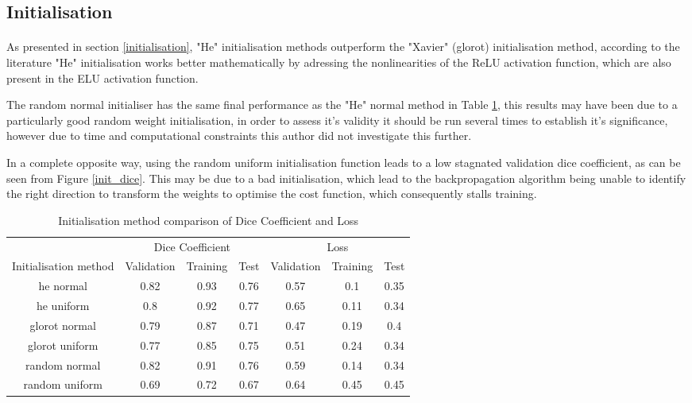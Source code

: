 \subsection{Initialisation}
\paragraph{}
As presented in section \ref{initialisation}, "He" initialisation methods outperform the "Xavier" (glorot) initialisation method, according to the literature "He" initialisation works better mathematically by adressing the nonlinearities of the \gls{ReLU} activation function, which are also present in the \gls{ELU} activation function. 

The random normal initialiser has the same final performance as the "He" normal method in Table \ref{tab_init}, this results may have been due to a particularly good random weight initialisation, in order to assess it's validity it should be run several times to establish it's significance, however due to time and computational constraints this author did not investigate this further.

In a complete opposite way, using the random uniform initialisation function leads to a low stagnated validation dice coefficient, as can be seen from Figure \ref{init_dice}. This may be due to a bad initialisation, which lead to the backpropagation algorithm being unable to identify the right direction to transform the weights to optimise the cost function, which consequently stalls training.

\begin{table}[ht!] 
    \begin{center}
    \begin{tabular}{ccccccc} 
    \toprule
       & \multicolumn{3}{c}{Dice Coefficient}     & \multicolumn{3}{c}{Loss} \\
    Initialisation method & Validation & Training & Test & Validation    & Training    & Test   \\ \midrule
    \rowcolor{lightgray} he normal & 0.82 & 0.93 & 0.76 & 0.57 & 0.1 & 0.35  \\ he uniform & 0.8 & 0.92 & 0.77 & 0.65 & 0.11 & 0.34  \\ glorot normal & 0.79 & 0.87 & 0.71 & 0.47 & 0.19 & 0.4  \\ glorot uniform & 0.77 & 0.85 & 0.75 & 0.51 & 0.24 & 0.34  \\ random normal & 0.82 & 0.91 & 0.76 & 0.59 & 0.14 & 0.34  \\ random uniform & 0.69 & 0.72 & 0.67 & 0.64 & 0.45 & 0.45  \\
    \bottomrule
    \end{tabular}
  \end{center} 
  \caption{Initialisation method comparison of Dice Coefficient and Loss}\label{tab_init}
\end{table}

